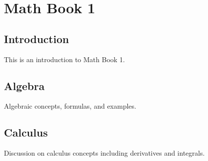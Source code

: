 \chapter{Math Book 1}

\section{Introduction}
This is an introduction to Math Book 1.

\section{Algebra}
Algebraic concepts, formulas, and examples.

\section{Calculus}
Discussion on calculus concepts including derivatives and integrals.
